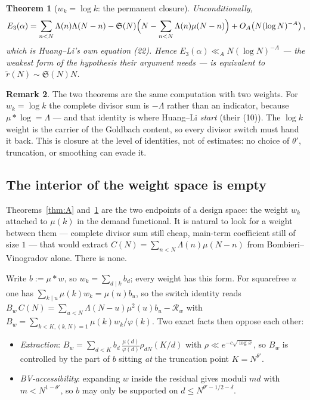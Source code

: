 \documentclass[11pt,a4paper]{article}
\theoremstyle{plain}
\newtheorem{theorem}{Theorem}
\theoremstyle{definition}
\newtheorem{remark}[theorem]{Remark}
\renewcommand{\SS}{\mathfrak{S}}
\begin{document}
\begin{theorem}[$w_k = \log k$: the permanent closure]\label{thm:C}
Unconditionally,
\[
  E_3(\alpha) = \sum_{n<N}\Lambda(n)\Lambda(N-n)
   - \SS(N)\Bigl(N - \sum_{n<N}\Lambda(n)\mu(N-n)\Bigr)
   + O_A\!\left(N(\log N)^{-A}\right),
\]
which is Huang--Li's own equation (22). Hence
$E_3(\alpha)\ll_A N(\log N)^{-A}$ --- the weakest form of the
hypothesis their argument needs --- is \emph{equivalent} to
$\tilde r(N)\sim\SS(N)N$.
\end{theorem}

\begin{remark}
The two theorems are the same computation with two weights. For
$w_k = \log k$ the complete divisor sum is $-\Lambda$ rather than an
indicator, because $\mu * \log = \Lambda$ --- and that identity is
where Huang--Li \emph{start} (their (10)). The $\log k$ weight is the
carrier of the Goldbach content, so every divisor switch must hand it
back. This is closure at the level of identities, not of estimates: no
choice of $\theta'$, truncation, or smoothing can evade it.
\end{remark}

\subsection{The interior of the weight space is empty}

Theorems~\ref{thm:A} and~\ref{thm:C} are the two endpoints of a design
space: the weight $w_k$ attached to $\mu(k)$ in the demand functional.
It is natural to look for a weight between them --- complete divisor
sum still cheap, main-term coefficient still of size $1$ --- that would
extract $C(N)=\sum_{n<N}\Lambda(n)\mu(N-n)$ from
Bombieri--Vinogradov alone. There is none.

Write $b := \mu*w$, so $w_k=\sum_{d\mid k}b_d$; every weight has this
form. For squarefree $u$ one has $\sum_{k\mid u}\mu(k)w_k=\mu(u)b_u$,
so the switch identity reads
$B_w\,C(N)=\sum_{u<N}\Lambda(N-u)\mu^2(u)b_u-\mathcal R_w$ with
$B_w=\sum_{k<K,(k,N)=1}\mu(k)w_k/\varphi(k)$. Two exact facts then
oppose each other:

\begin{itemize}
\item \emph{Extraction}:
  $B_w=\sum_{d<K}b_d\,\frac{\mu(d)}{\varphi(d)}\rho_{dN}(K/d)$ with
  $\rho \ll e^{-c\sqrt{\log x}}$, so $B_w$ is controlled by the part of
  $b$ sitting \emph{at} the truncation point $K=N^{\theta'}$.
\item \emph{BV-accessibility}: expanding $w$ inside the residual gives
  moduli $md$ with $m<N^{1-\theta'}$, so $b$ may only be supported on
  $d\le N^{\theta'-1/2-\delta}$.
\end{itemize}
\end{document}
